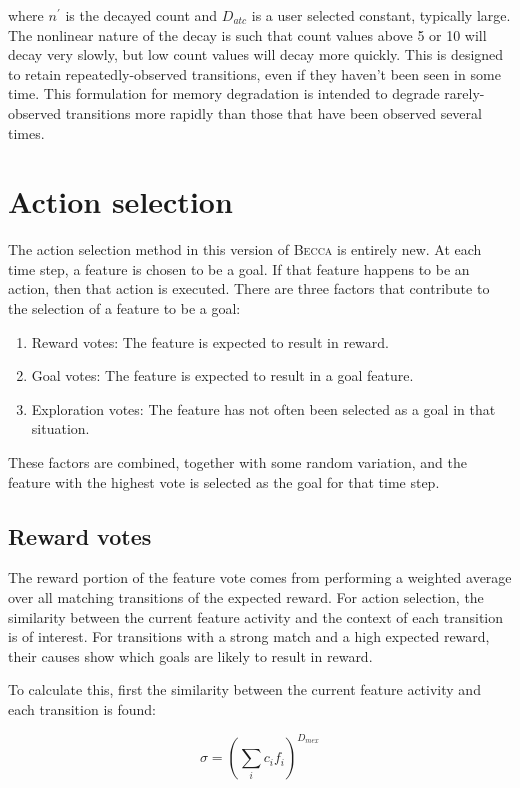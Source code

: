 where $n^\prime$ is the decayed count and $D_{atc}$ is a user selected constant, typically large. The nonlinear nature of the decay is such that count values above 5 or 10 will decay very slowly, but low count values will decay more quickly. This is designed to retain repeatedly-observed transitions, even if they haven't been seen in some time. This formulation for memory degradation is intended to degrade rarely-observed transitions more rapidly than those that have been observed several times.  

\section{Action selection}

The action selection method in this version of \textsc{Becca} is entirely new. At each time step, a feature is chosen to be a goal. If that feature happens to be an action, then that action is executed. There are three factors that contribute to the selection of a feature to be a goal:

\begin{enumerate}
\item Reward votes: The feature is expected to result in reward.
\item Goal votes: The feature is expected to result in a goal feature.
\item Exploration votes: The feature has not often been selected as a goal in that situation.
\end{enumerate}

These factors are combined, together with some random variation, and the feature with the highest vote is selected as the goal for that time step.

\subsection{Reward votes}

The reward portion of the feature vote comes from performing a weighted average over all matching transitions of the expected reward. For action selection, the similarity between the current feature activity and the context of each transition is of interest. For transitions with a strong match and a high expected reward, their causes show which goals are likely to result in reward. 

To calculate this, first the similarity between the current feature activity and each transition is found:

\begin{equation}
\sigma = \left ( \sum_i c_i f_i \right ) ^{D_{mex}}
\end{equation}

